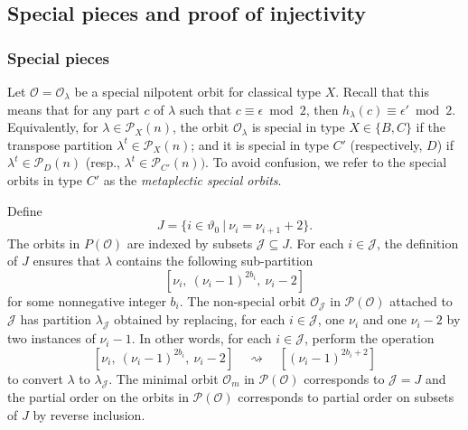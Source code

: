 \documentclass{amsart}
\theoremstyle{definition}
\newcommand{\cP}{\mathcal{P}}
\newcommand{\0}{\mathcal{O}}
\begin{document}
\subsection{Special pieces and proof of injectivity}\label{subsec:sp_pieces_and_injective}

\subsubsection{Special pieces} \label{subsubsec:sp_pieces}

Let $\0=\0_\lambda$ be a special nilpotent orbit for classical type $X$.
Recall that this means that for any part $c$ of $\lambda$ such that 
$ c\equiv\epsilon\bmod 2$,  then $h_\lambda(c)\equiv \epsilon'\bmod 2$.
Equivalently, for $\lambda \in \mathcal P_X(n)$, the orbit $\0_\lambda$ is special 
in type $X \in \{B,C\}$ if the transpose
partition $\lambda^t \in \mathcal P_X(n)$; and it is special in type
$C'$ (respectively, $D$) if $\lambda^t \in \mathcal P_D(n)$ (resp., 
$\lambda^t \in \mathcal P_{C'}(n))$.  To avoid confusion,
we refer to the special orbits in type $C'$ as the {\it metaplectic special orbits}.

Define
\begin{equation}\label{equation:def_J}
J = \{ i \in \vartheta_0 \ | \ \nu_{i} = \nu_{i+1}+2\}.
\end{equation}
The orbits in $P(\0)$ are indexed by subsets $\mathcal J \subseteq J$. 
For each $i \in \mathcal J$, the definition of $J$ ensures that 
$\lambda$ contains the following sub-partition
$$[\nu_i, \ (\nu_i-1)^{2b_i},\ \nu_i-2]$$
for some nonnegative integer $b_i$.
The non-special orbit $\0_{\mathcal J}$ in $\cP(\0)$ attached to ${\mathcal J}$ has 
partition $\lambda_{\mathcal J}$ obtained by replacing, for each $i \in {\mathcal J}$, one $\nu_i$ and one $\nu_i-2$ by two instances of $\nu_i-1$.  In other words, for each $i \in {\mathcal J}$, 
perform the operation 
\begin{equation}\label{equation:special_degenerations}
[\nu_i, \ (\nu_i-1)^{2b_i},\ \nu_i-2]
\quad\rightsquigarrow\quad [(\nu_i-1)^{2b_i+2}]
\end{equation}
to convert $\lambda$ to $\lambda_{\mathcal J}$. The minimal orbit $\0_m$ in $\cP(\0)$ corresponds to $\mathcal J=J$ and the partial order on the orbits in $\cP(\0)$ corresponds to partial order on subsets of $J$ by reverse inclusion.
\end{document}
